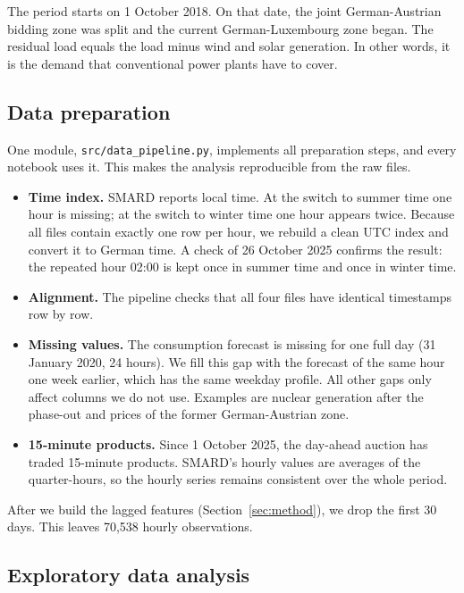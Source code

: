 \documentclass[12pt,oneside]{article}
\begin{document}
The period starts on 1 October 2018. On that date, the joint German-Austrian bidding zone was split and the current German-Luxembourg zone began. The residual load equals the load minus wind and solar generation. In other words, it is the demand that conventional power plants have to cover.

\subsection{Data preparation}

One module, \texttt{src/data\_pipeline.py}, implements all preparation steps, and every notebook uses it. This makes the analysis reproducible from the raw files.

\begin{itemize}
    \item \textbf{Time index.} SMARD reports local time. At the switch to summer time one hour is missing; at the switch to winter time one hour appears twice. Because all files contain exactly one row per hour, we rebuild a clean UTC index and convert it to German time. A check of 26 October 2025 confirms the result: the repeated hour 02:00 is kept once in summer time and once in winter time.
    \item \textbf{Alignment.} The pipeline checks that all four files have identical timestamps row by row.
    \item \textbf{Missing values.} The consumption forecast is missing for one full day (31 January 2020, 24 hours). We fill this gap with the forecast of the same hour one week earlier, which has the same weekday profile. All other gaps only affect columns we do not use. Examples are nuclear generation after the phase-out and prices of the former German-Austrian zone.
    \item \textbf{15-minute products.} Since 1 October 2025, the day-ahead auction has traded 15-minute products. SMARD's hourly values are averages of the quarter-hours, so the hourly series remains consistent over the whole period.
\end{itemize}

After we build the lagged features (Section~\ref{sec:method}), we drop the first 30 days. This leaves 70,538 hourly observations.

\subsection{Exploratory data analysis}
\end{document}
